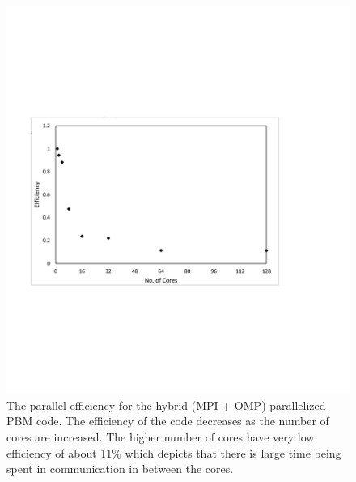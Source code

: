 \documentclass[preprint,11pt,authoryear]{elsarticle}
\begin{document}
\begin{figure}[H]
\centering
\includegraphics[scale=0.7]{rslts_PBM_Efficiency.pdf}
\caption{The parallel efficiency for the hybrid (MPI + OMP) parallelized PBM code. The efficiency of the code decreases as the number of cores are increased. The higher number of cores have very low efficiency of about 11\% which depicts that there is large time being spent in communication in between the cores.}
\label{fig:rslts_PBM_parallel_efficiency}
\end{figure}
\end{document}
